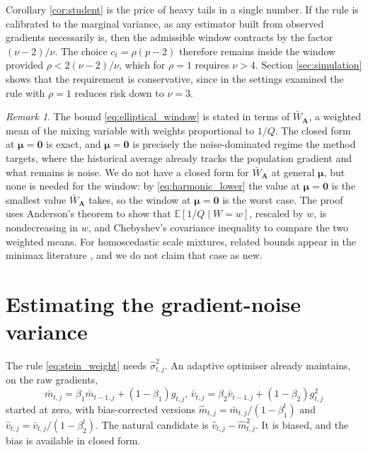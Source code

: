 \documentclass[a4paper,fleqn]{cas-dc}
\theoremstyle{plain}
\theoremstyle{definition}
\theoremstyle{remark}
\newtheorem{remark}{Remark}
\newcommand{\rev}[1]{#1}
\newcommand{\E}{\mathbb{E}}
\begin{document}
Corollary \ref{cor:student} is the price of heavy tails in a single number. If the rule is calibrated to the marginal variance, as any estimator built from observed gradients necessarily is, then the admissible window contracts by the factor $(\nu-2)/\nu$. The choice $c_t=\rho(p-2)$ therefore remains inside the window provided $\rho<2(\nu-2)/\nu$, which for $\rho=1$ requires $\nu>4$. Section \ref{sec:simulation} shows that the requirement is conservative, since in the settings examined the rule with $\rho=1$ reduces risk down to $\nu=3$.

\begin{remark}
The bound \eqref{eq:elliptical_window} is stated in terms of $\bar W_{\bm A}$, a weighted mean of the mixing variable with weights proportional to $1/Q$. The closed form at $\bm\mu=\bm 0$ is exact, and $\bm\mu=\bm 0$ is precisely the noise-dominated regime the method targets, where the historical average already tracks the population gradient and what remains is noise. \rev{We do not have a closed form for $\bar W_{\bm A}$ at general $\bm\mu$, but none is needed for the window: by \eqref{eq:harmonic_lower} the value at $\bm\mu=\bm 0$ is the smallest value $\bar W_{\bm A}$ takes, so the window at $\bm\mu=\bm 0$ is the worst case. The proof uses Anderson's theorem \citep{anderson1955} to show that $\E[1/Q\mid W=w]$, rescaled by $w$, is nondecreasing in $w$, and Chebyshev's covariance inequality to compare the two weighted means. For homoscedastic scale mixtures, related bounds appear in the minimax literature \citep{strawderman1974, fourdrinier2018}, and we do not claim that case as new.}
\end{remark}

\section{Estimating the gradient-noise variance}
\label{sec:variance}

The rule \eqref{eq:stein_weight} needs $\hat\sigma^2_{t,j}$. An adaptive optimiser already maintains, on the raw gradients,
\begin{equation}
\label{eq:moments}
\bar m_{t,j}=\beta_1\bar m_{t-1,j}+(1-\beta_1)g_{t,j},
\,
\bar v_{t,j}=\beta_2\bar v_{t-1,j}+(1-\beta_2)g^2_{t,j}
\end{equation}
started at zero, with bias-corrected versions $\hat m_{t,j}=\bar m_{t,j}/(1-\beta_1^{t})$ and $\hat v_{t,j}=\bar v_{t,j}/(1-\beta_2^{t})$. The natural candidate is $\hat v_{t,j}-\hat m^2_{t,j}$. It is biased, and the bias is available in closed form.
\end{document}
